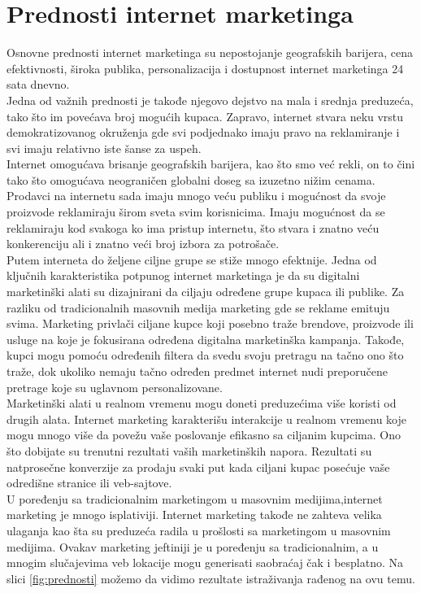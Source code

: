 \documentclass[a4paper]{article}
\begin{document}
{\section{Prednosti internet marketinga}
\label{sec:prednosti}
Osnovne prednosti internet marketinga su nepostojanje geografskih barijera, cena efektivnosti, široka publika, personalizacija i dostupnost internet marketinga 24 sata dnevno.
\\Jedna od važnih prednosti je takođe njegovo dejstvo na mala i srednja preduzeća, tako što im povećava broj mogućih kupaca. Zapravo, internet stvara neku vrstu demokratizovanog okruženja gde svi podjednako imaju pravo na reklamiranje i svi imaju relativno iste šanse za uspeh.
\\Internet omogućava brisanje geografskih barijera, kao što smo već rekli, on to čini tako što omogućava neograničen globalni doseg sa izuzetno nižim cenama. Prodavci na internetu sada imaju mnogo veću publiku i mogućnost da svoje proizvode reklamiraju širom sveta svim korisnicima. Imaju mogućnost da se reklamiraju kod svakoga ko ima pristup internetu, što stvara i znatno veću konkerenciju ali i znatno veći broj izbora za potrošače.
\\Putem interneta do željene ciljne grupe se stiže mnogo efektnije.
Jedna od ključnih karakteristika potpunog internet marketinga je da su digitalni marketinški alati su dizajnirani da ciljaju određene grupe kupaca ili publike. Za razliku od tradicionalnih masovnih medija marketing gde se reklame emituju svima. Marketing privlači ciljane kupce koji posebno traže brendove, proizvode ili usluge na koje je fokusirana određena digitalna marketinška kampanja. Takođe, kupci mogu pomoću određenih filtera da svedu svoju pretragu na tačno ono što traže, dok ukoliko nemaju tačno određen predmet internet nudi preporučene pretrage koje su uglavnom personalizovane.
\\Marketinški alati u realnom vremenu mogu doneti preduzećima više koristi od drugih alata. Internet marketing karakterišu interakcije u realnom vremenu koje mogu mnogo više da povežu vaše poslovanje
efikasno sa ciljanim kupcima. Ono što dobijate su trenutni rezultati vaših marketinških napora. Rezultati su natprosečne konverzije za prodaju svaki put kada ciljani kupac posećuje vaše odredišne stranice ili veb-sajtove.
\\U poređenju sa tradicionalnim marketingom u masovnim medijima,internet marketing je mnogo isplativiji. Internet marketing takođe ne zahteva  velika ulaganja kao šta su preduzeća radila u prošlosti sa marketingom u masovnim medijima. Ovakav marketing jeftiniji je u poređenju sa tradicionalnim, a u mnogim slučajevima veb lokacije mogu generisati saobraćaj čak i besplatno. Na slici \ref{fig:prednosti} možemo da vidimo rezultate istraživanja rađenog na ovu temu.
\cite{prednosti i mane}

}
\end{document}
